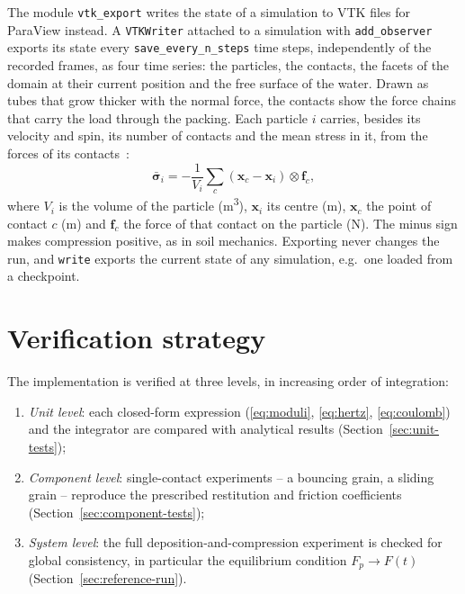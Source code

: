 The module \texttt{vtk\_export} writes the state of a simulation to VTK files for ParaView instead.
A \texttt{VTKWriter} attached to a simulation with \texttt{add\_observer} exports its state every \texttt{save\_every\_n\_steps} time steps, independently of the recorded frames, as four time series: the particles, the contacts, the facets of the domain at their current position and the free surface of the water.
Drawn as tubes that grow thicker with the normal force, the contacts show the force chains that carry the load through the packing.
Each particle $i$ carries, besides its velocity and spin, its number of contacts and the mean stress in it, from the forces of its contacts~\cite{TODO}:
\begin{equation}
  \bar{\boldsymbol{\sigma}}_{i} = -\frac{1}{V_{i}} \sum_{c}
  \left(\mathbf{x}_{c} - \mathbf{x}_{i}\right) \otimes \mathbf{f}_{c},
  \label{eq:particle-stress}
\end{equation}
where $V_{i}$ is the volume of the particle (\unit{\cubic\metre}), $\mathbf{x}_{i}$ its centre (\unit{\metre}), $\mathbf{x}_{c}$ the point of contact $c$ (\unit{\metre}) and $\mathbf{f}_{c}$ the force of that contact on the particle (\unit{\newton}).
The minus sign makes compression positive, as in soil mechanics.
Exporting never changes the run, and \texttt{write} exports the current state of any simulation, e.g.\ one loaded from a checkpoint.

\section{Verification strategy}
\label{sec:verification}

The implementation is verified at three levels, in increasing order of
integration:
\begin{enumerate}[leftmargin=2.2em]
  \item \emph{Unit level}: each closed-form expression
        (\eqref{eq:moduli}, \eqref{eq:hertz}, \eqref{eq:coulomb}) and the
        integrator are compared with analytical results
        (Section~\ref{sec:unit-tests});
  \item \emph{Component level}: single-contact experiments -- a bouncing grain,
        a sliding grain -- reproduce the prescribed restitution and friction
        coefficients (Section~\ref{sec:component-tests});
  \item \emph{System level}: the full deposition-and-compression experiment is
        checked for global consistency, in particular the equilibrium condition
        $F_{p}\to F(t)$ (Section~\ref{sec:reference-run}).
\end{enumerate}

